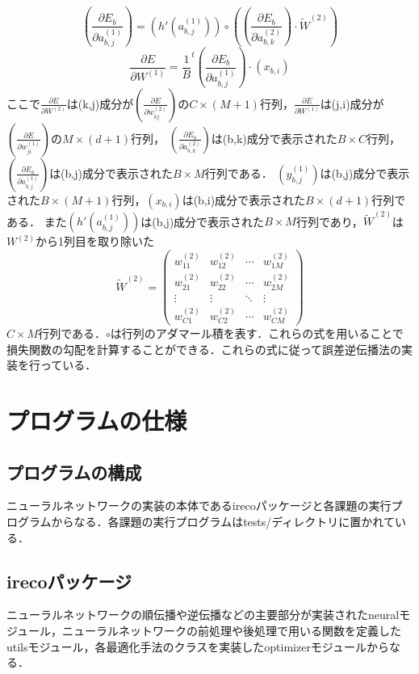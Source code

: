 \documentclass[uplatex]{jsarticle}
\begin{document}
    $$\left( \frac{\partial E_b}{\partial a_{b,j}^{(1)}} \right) = \left( h'(a_{b,j}^{(1)}) \right) \circ \left( \left( \frac{\partial E_b}{\partial a_{b,k}^{(2)}} \right) \cdot \tilde{W}^{(2)} \right)$$
    $$\frac{\partial E}{\partial W^{(1)}} = \frac{1}{B} ^t\!{\left( \frac{\partial E_b}{\partial a_{b,j}^{(1)}} \right)} \cdot \left( x_{b,i} \right)$$
    ここで$\frac{\partial E}{\partial W^{(2)}}$は(k,j)成分が$\left( \frac{\partial E}{\partial w_{kj}^{(2)}}\right)$の$C \times (M+1)$行列，$\frac{\partial E}{\partial W^{(1)}}$は(j,i)成分が$\left( \frac{\partial E}{\partial w_{ji}^{(1)}}\right)$の$M \times (d+1)$行列，
    $\left( \frac{\partial E_b}{\partial a_{b,k}^{(2)}} \right)$は(b,k)成分で表示された$B \times C$行列，$\left( \frac{\partial E_b}{\partial a_{b,j}^{(1)}} \right)$は(b,j)成分で表示された$B \times M$行列である．
    $\left( y_{b,j}^{(1)} \right)$は(b,j)成分で表示された$B \times (M+1)$行列，$\left( x_{b,i} \right)$は(b,i)成分で表示された$B \times (d+1)$行列である．
    また$\left( h'(a_{b,j}^{(1)}) \right)$は(b,j)成分で表示された$B \times M$行列であり，$\tilde{W}^{(2)}$は$W^{(2)}$から1列目を取り除いた
    $$ \tilde{W}^{(2)} = 
    \begin{pmatrix}
        w_{11}^{(2)} & w_{12}^{(2)} & \cdots & w_{1M}^{(2)} \\
        w_{21}^{(2)} & w_{22}^{(2)} & \cdots & w_{2M}^{(2)} \\
        \vdots & \vdots & \ddots & \vdots \\
        w_{C1}^{(2)} & w_{C2}^{(2)} & \cdots & w_{CM}^{(2)} 
    \end{pmatrix}
    $$
    $C \times M$行列である．$\circ$は行列のアダマール積を表す．これらの式を用いることで損失関数の勾配を計算することができる．これらの式に従って誤差逆伝播法の実装を行っている．

    \section{プログラムの仕様}

    \subsection{プログラムの構成}
    ニューラルネットワークの実装の本体であるirecoパッケージと各課題の実行プログラムからなる．各課題の実行プログラムはtests/ディレクトリに置かれている．

    \subsection{irecoパッケージ}
    ニューラルネットワークの順伝播や逆伝播などの主要部分が実装されたneuralモジュール，ニューラルネットワークの前処理や後処理で用いる関数を定義したutilsモジュール，各最適化手法のクラスを実装したoptimizerモジュールからなる．
\end{document}

